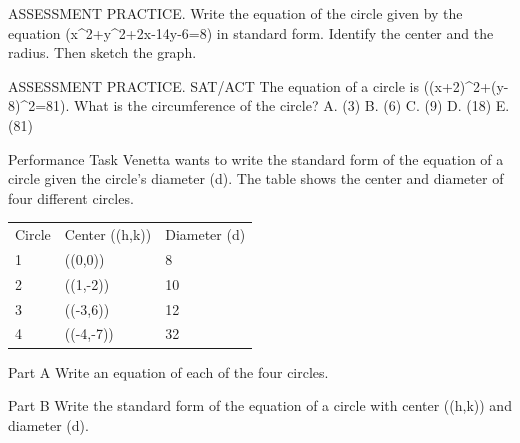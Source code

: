 \documentclass{article}
\newenvironment{practice}[2]{}{}        %
\newcommand{\answer}[1]{}               %
\newcommand{\placeholder}[2]{}          %
\begin{document}
\begin{practice}{37}{1}
ASSESSMENT PRACTICE. Write the equation of the circle given by the equation (x^2+y^2+2x-14y-6=8) in standard form. Identify the center and the radius. Then sketch the graph.
\answer{Standard form: ((x-(-1))^2+(y-7)^2=64), center: ((-1,7)), radius: 8; see graph.}
\placeholder{graph}{Answer 37: Grid spaced by 2 with black double-arrow x and y axes, O at origin, x window [-10,10], y [-4,16], x labels -8,-4,4,8, y labels 4,8,12. Red circle centered at (-1,7), radius 8, extrema (-9,7), (7,7), (-1,-1), (-1,15).}
\end{practice}
\begin{practice}{38}{2}
ASSESSMENT PRACTICE. SAT/ACT The equation of a circle is ((x+2)^2+(y-8)^2=81). What is the circumference of the circle?
A. (3\pi)
B. (6\pi)
C. (9\pi)
D. (18\pi)
E. (81\pi)
\answer{D}
\end{practice}
\begin{practice}{39}{3}
Performance Task Venetta wants to write the standard form of the equation of a circle given the circle's diameter (d). The table shows the center and diameter of four different circles.
\begin{tabular}{lll}
Circle & Center ((h,k)) & Diameter (d) \\
1 & ((0,0)) & 8 \\
2 & ((1,-2)) & 10 \\
3 & ((-3,6)) & 12 \\
4 & ((-4,-7)) & 32 \\
\end{tabular}
Part A Write an equation of each of the four circles.
\answer{Circle 1: (x^2+y^2=16); Circle 2: ((x-1)^2+(y+2)^2=25); Circle 3: ((x+3)^2+(y-6)^2=36); Circle 4: ((x+4)^2+(y+7)^2=256)}
Part B Write the standard form of the equation of a circle with center ((h,k)) and diameter (d).
\answer{((x-h)^2+(y-k)^2=(\frac{d}{2})^2)}
\end{practice}
\end{document}
